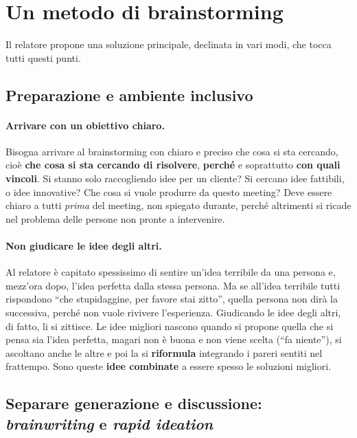 \section{Un metodo di brainstorming}
\label{sec:z2-metodo}

Il relatore propone una soluzione principale, declinata in vari modi, che tocca
tutti questi punti.

\subsection{Preparazione e ambiente inclusivo}

\paragraph{Arrivare con un obiettivo chiaro.} Bisogna arrivare al brainstorming con
chiaro e preciso che cosa si sta cercando, cioè \textbf{che cosa si sta cercando di
risolvere}, \textbf{perché} e soprattutto \textbf{con quali vincoli}. Si stanno solo
raccogliendo idee per un cliente? Si cercano idee fattibili, o idee innovative? Che
cosa si vuole produrre da questo meeting? Deve essere chiaro a tutti \emph{prima}
del meeting, non spiegato durante, perché altrimenti si ricade nel problema delle
persone non pronte a intervenire.

\paragraph{Non giudicare le idee degli altri.} Al relatore è capitato spessissimo di
sentire un'idea terribile da una persona e, mezz'ora dopo, l'idea perfetta dalla
stessa persona. Ma se all'idea terribile tutti rispondono ``che stupidaggine, per
favore stai zitto'', quella persona non dirà la successiva, perché non vuole
rivivere l'esperienza. Giudicando le idee degli altri, di fatto, li si zittisce.
Le idee migliori nascono quando si propone quella che si pensa sia l'idea perfetta,
magari non è buona e non viene scelta (``fa niente''), si ascoltano anche le altre e
poi la si \textbf{riformula} integrando i pareri sentiti nel frattempo. Sono queste
\textbf{idee combinate} a essere spesso le soluzioni migliori.

\subsection{Separare generazione e discussione: \emph{brainwriting} e
\emph{rapid ideation}}


